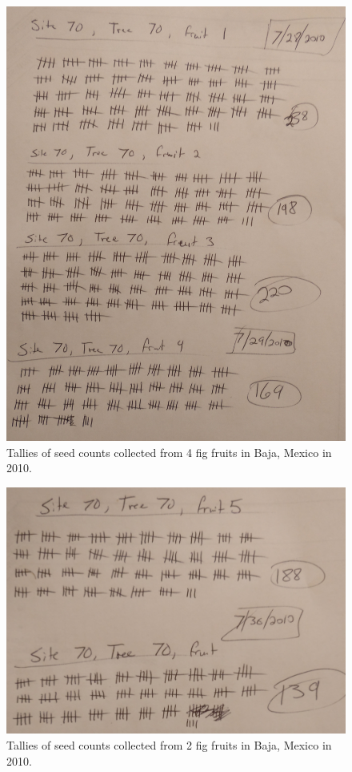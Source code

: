 \documentclass[
]{scrbook}
\begin{document}
\begin{figure}
\includegraphics[width=1\linewidth]{img/Ch1_Ex1_seeds1} \caption{Tallies of seed counts collected from 4 fig fruits in Baja, Mexico in 2010.}\label{fig:unnamed-chunk-14}
\end{figure}

\begin{figure}
\includegraphics[width=1\linewidth]{img/Ch1_Ex1_seeds2} \caption{Tallies of seed counts collected from 2 fig fruits in Baja, Mexico in 2010.}\label{fig:unnamed-chunk-15}
\end{figure}
\end{document}
